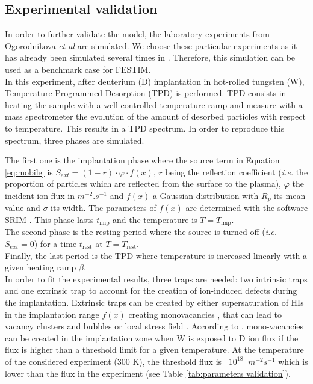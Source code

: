 \subsection{Experimental validation}
In order to further validate the model, the laboratory experiments from Ogorodnikova \textit{et al} \cite{ogorodnikova_deuterium_2003} are simulated.
We choose these particular experiments as it has already been simulated several times in .
Therefore, this simulation can be used as a benchmark case for FESTIM.\\
In this experiment, after deuterium (D) implantation in hot-rolled tungsten (W), Temperature Programmed Desorption (TPD) is performed.
TPD consists in heating the sample with a well controlled temperature ramp and measure with a mass spectrometer the evolution of the amount of desorbed particles with respect to temperature.
This results in a TPD spectrum.
In order to reproduce this spectrum, three phases are simulated.

The first one is the implantation phase where the source term in Equation \ref{eq:mobile} is $S_{ext} = (1-r) \cdot \varphi \cdot f(x)$, $r$ being the reflection coefficient (\textit{i.e.} the proportion of particles which are reflected from the surface to the plasma), $\varphi$ the incident ion flux in $\si{m^{-2}.s^{-1}}$ and $f(x)$ a Gaussian distribution with $R_p$ its mean value and $\sigma$ its width.
The parameters of $f(x)$ are determined with the software SRIM .
This phase lasts $t_\mathrm{imp}$ and the temperature is $T = T_\mathrm{imp}$.\\
The second phase is the resting period where the source is turned off (\textit{i.e.} $S_{ext} = 0$) for a time $t_\mathrm{rest}$ at $T = T_\mathrm{rest}$.\\
Finally, the last period is the TPD where temperature is increased linearly with a given heating ramp $\beta$.\\
In order to fit the experimental results, three traps are needed: two intrinsic traps and one extrinsic trap to account for the creation of ion-induced defects during the implantation.
Extrinsic traps can be created by either supersaturation of HIs in the implantation range $f(x)$ creating monovacancies , that can lead to vacancy clusters and bubbles  or local stress field .
According to , mono-vacancies can be created in the implantation zone when W is exposed to D ion flux if the flux is higher than a threshold limit for a given temperature.
At the temperature of the considered experiment (300 K), the threshold flux is ~$10^{18}$ $\: \si{m^{-2}s^{-1}}$ which is lower than the flux in the experiment (see Table \ref{tab:parameters validation}).


